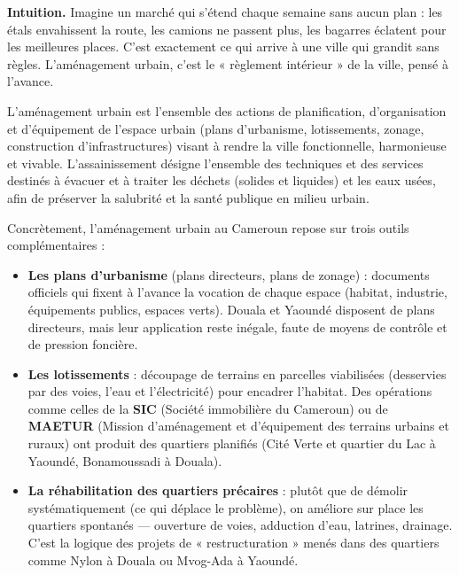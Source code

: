 \documentclass[11pt]{article}
\newcommand{\cle}[1]{{\popxbold\color{popdark}#1}}
\begin{document}
\textbf{Intuition.} Imagine un marché qui s'étend chaque semaine sans aucun plan : les étals envahissent la route, les camions ne passent plus, les bagarres éclatent pour les meilleures places. C'est exactement ce qui arrive à une ville qui grandit sans règles. L'aménagement urbain, c'est le « règlement intérieur » de la ville, pensé à l'avance.

\begin{definition}
L'\cle{aménagement urbain} est l'ensemble des actions de planification, d'organisation et d'équipement de l'espace urbain (plans d'urbanisme, lotissements, zonage, construction d'infrastructures) visant à rendre la ville fonctionnelle, harmonieuse et vivable.
L'\cle{assainissement} désigne l'ensemble des techniques et des services destinés à évacuer et à traiter les déchets (solides et liquides) et les eaux usées, afin de préserver la salubrité et la santé publique en milieu urbain.
\end{definition}

Concrètement, l'aménagement urbain au Cameroun repose sur trois outils complémentaires :

\begin{itemize}
\item \textbf{Les plans d'urbanisme} (plans directeurs, plans de zonage) : documents officiels qui fixent à l'avance la vocation de chaque espace (habitat, industrie, équipements publics, espaces verts). Douala et Yaoundé disposent de plans directeurs, mais leur application reste inégale, faute de moyens de contrôle et de pression foncière.
\item \textbf{Les lotissements} : découpage de terrains en parcelles viabilisées (desservies par des voies, l'eau et l'électricité) pour encadrer l'habitat. Des opérations comme celles de la \textbf{SIC} (Société immobilière du Cameroun) ou de \textbf{MAETUR} (Mission d'aménagement et d'équipement des terrains urbains et ruraux) ont produit des quartiers planifiés (Cité Verte et quartier du Lac à Yaoundé, Bonamoussadi à Douala).
\item \textbf{La réhabilitation des quartiers précaires} : plutôt que de démolir systématiquement (ce qui déplace le problème), on améliore sur place les quartiers spontanés — ouverture de voies, adduction d'eau, latrines, drainage. C'est la logique des projets de « restructuration » menés dans des quartiers comme Nylon à Douala ou Mvog-Ada à Yaoundé.
\end{itemize}
\end{document}
